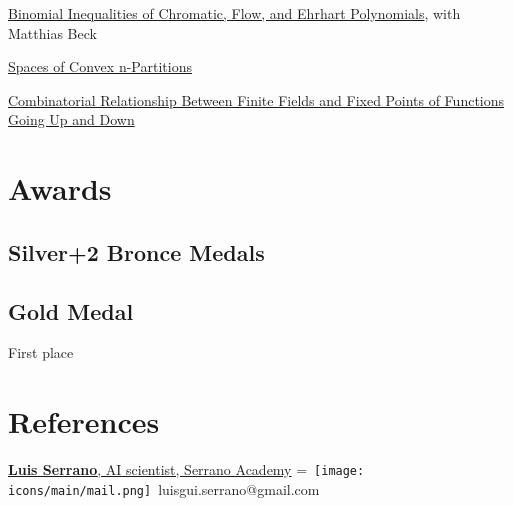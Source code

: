 \documentclass[]{plushcv}
\begin{document}
\begin{minipage}[t]{0.25\textwidth}
\textbullet{} \href{https://arxiv.org/abs/1804.00208}{Binomial Inequalities of Chromatic, Flow, and Ehrhart Polynomials}, with  Matthias Beck 

\textbullet{} \href{https://arxiv.org/abs/1511.02904}{Spaces of Convex n-Partitions}

\textbullet{} \href{https://arxiv.org/abs/2111.13745}{Combinatorial Relationship Between Finite Fields and Fixed Points of Functions Going Up and Down} 


\sectionsep


\section{Awards} 
\subsection{Silver+2 Bronce Medals}


\subsection{Gold Medal}
 First place





\section{References} 
\href{https://serrano.academy/}{\textbf{Luis Serrano}, AI scientist, Serrano Academy}
\begingroup
{}=\hbox{
\texttt{[image: icons/main/mail.png]}\hspace{0.3cm} luisgui.serrano@gmail.com
}
\parbox{\wd0}{}
\endgroup


\end{minipage}
\end{document}
